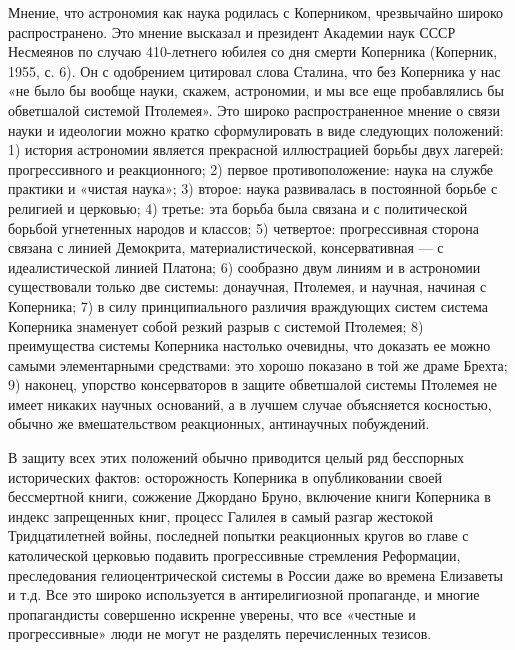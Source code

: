 Мнение, что  астрономия как  наука родилась с  Коперником, чрезвычайно
широко распространено.  Это мнение высказал и  президент Академии наук
СССР Несмеянов  по случаю 410-летнего  юбилея со дня  смерти Коперника
(Коперник, 1955, с.  6). Он с одобрением цитировал  слова Сталина, что
без Коперника у нас «не было бы вообще науки, скажем, астрономии, и мы
все  еще пробавлялись  бы  обветшалой системой  Птолемея». Это  широко
распространенное  мнение  о  связи  науки  и  идеологии  можно  кратко
сформулировать  в  виде  следующих положений:  1)  история  астрономии
является прекрасной иллюстрацией борьбы двух лагерей: прогрессивного и
реакционного; 2)  первое противоположение: наука на  службе практики и
«чистая  наука»;  3) второе:  наука  развивалась  в постоянной  борьбе
с  религией  и церковью;  4)  третье:  эта  борьба  была связана  и  с
политической  борьбой  угнетенных  народов и  классов;  5)  четвертое:
прогрессивная сторона связана  с линией Демокрита, материалистической,
консервативная --- с идеалистической линией Платона; 6) сообразно двум
линиям  и в  астрономии  существовали только  две системы:  донаучная,
Птолемея, и  научная, начиная с  Коперника; 7) в  силу принципиального
различия враждующих  систем система  Коперника знаменует  собой резкий
разрыв  с   системой  Птолемея;  8)  преимущества   системы  Коперника
настолько  очевидны,  что  доказать   ее  можно  самыми  элементарными
средствами: это  хорошо показано  в той же  драме Брехта;  9) наконец,
упорство консерваторов  в защите обветшалой системы  Птолемея не имеет
никаких научных  оснований, а  в лучшем случае  объясняется косностью,
обычно же вмешательством реакционных, антинаучных побуждений.

В защиту  всех этих положений  обычно приводится целый  ряд бесспорных
исторических  фактов:  осторожность  Коперника в  опубликовании  своей
бессмертной книги, сожжение Джордано  Бруно, включение книги Коперника
в индекс  запрещенных книг,  процесс Галилея  в самый  разгар жестокой
Тридцатилетней войны, последней попытки  реакционных кругов во главе с
католической  церковью подавить  прогрессивные стремления  Реформации,
преследования  гелиоцентрической  системы  в России  даже  во  времена
Елизаветы  и  т.д.  Все  это  широко  используется  в  антирелигиозной
пропаганде, и  многие пропагандисты  совершенно искренне  уверены, что
все «честные и прогрессивные» люди не могут не разделять перечисленных
тезисов.

